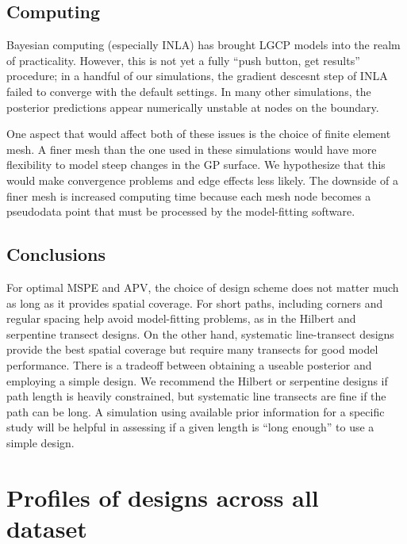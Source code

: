 \documentclass[review]{elsarticle}
\begin{document}


\subsection{Computing}

Bayesian computing (especially INLA) has brought LGCP models into the realm of
practicality. However, this is not yet a fully ``push button, get results''
procedure; in a handful of our simulations, the gradient descesnt step of INLA
failed to converge with the default settings. In many other simulations, the
posterior predictions appear numerically unstable at nodes on the boundary.

One aspect that would affect both of these issues is the choice of finite
element mesh. A finer mesh than the one used in these simulations would have
more flexibility to model steep changes in the GP surface. We hypothesize that
this would make convergence problems and edge effects less likely. The downside
of a finer mesh is increased computing time because each mesh node becomes a
pseudodata point that must be processed by the model-fitting software.


\subsection{Conclusions}

For optimal MSPE and APV, the choice of design scheme does not matter much as
long as it provides spatial coverage. For short paths, including corners and
regular spacing help avoid model-fitting problems, as in the Hilbert and
serpentine transect designs. On the other hand, systematic line-transect
designs provide the best spatial coverage but require many transects for good
model performance. There is a tradeoff between obtaining a useable posterior
and employing a simple design. We recommend the Hilbert or serpentine designs
if path length is heavily constrained, but systematic line transects are fine
if the path can be long. A simulation using available prior information for a
specific study will be helpful in assessing if a given length is ``long
enough'' to use a simple design.


\appendix
\section{Profiles of designs across all dataset}
\end{document}
